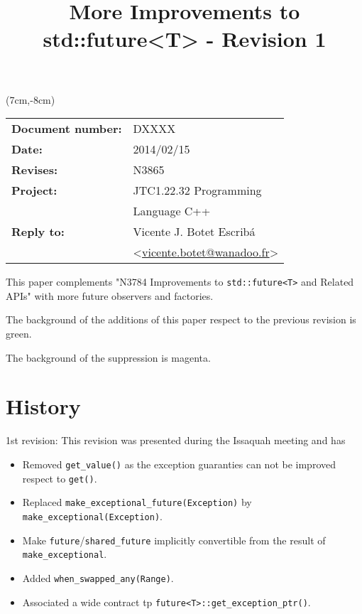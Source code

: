 \documentclass[a4paper,10pt]{article}
\title{More Improvements to std::future<T> - Revision 1}
\author{}
\date{}
\newcommand{\cpp}[1]{\lstinline{#1}}
\newcommand{\update}[1]{\colorbox{update_color}{#1}}
\begin{document}
\maketitle
\begin{textblock*}{9cm}(7cm,-8cm)
\begin{tabular}{l l}
\textbf{Document number:} & DXXXX \\
\textbf{Date:}  & 2014/02/15 \\
\textbf{Revises:} & N3865 \\
\textbf{Project:} & JTC1.22.32 Programming \\
 & Language C++ \\
\textbf{Reply to:} & Vicente J. Botet Escrib\'{a} \\
 & <\href{mailto:vicente.botet@wanadoo.fr}{vicente.botet@wanadoo.fr}> 
  
\end{tabular}
\end{textblock*}

\vspace{-6em}
\setcounter{tocdepth}{1}

This paper complements "N3784 Improvements to \cpp{std::future<T>} and Related APIs" \cite{N3784} with more future observers and factories.

\update{The background of the additions of this paper respect to the previous revision is green.}

\update{The background of the suppression is magenta.}


\tableofcontents

\section{History}

\update{1st revision: } This revision was presented during the Issaquah meeting and has
\begin{itemize}
\item{\update{Removed \cpp{get_value()} as the exception guaranties can not be improved respect to \cpp{get()}. }}
\item{\update{Replaced \cpp{make_exceptional_future(Exception)} by \cpp{make_exceptional(Exception)}. }}
\item{\update{Make \cpp{future}/\cpp{shared_future} implicitly convertible from the result of \cpp{make_exceptional}. }}
\item{\update{Added \cpp{when_swapped_any(Range)}. }}
\item{\update{Associated a wide contract tp \cpp{future<T>::get_exception_ptr()}.}}
\end{itemize}
\end{document}
